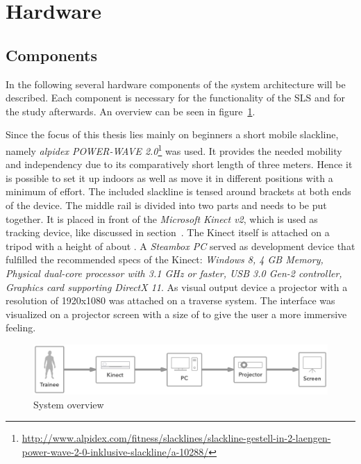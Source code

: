 \section{Hardware}\label{5_1_systemSetup}
\subsection{Components}\label{5_3_systemArchitecture}
In the following several hardware components of the system architecture will be described. Each component is necessary for the functionality of the SLS and for the study afterwards. An overview can be seen in figure~\ref{fig:5_3_systemArchitecture}.

Since the focus of this thesis lies mainly on beginners a short mobile slackline, namely \textit{alpidex POWER-WAVE 2.0}\footnote{\url{http://www.alpidex.com/fitness/slacklines/slackline-gestell-in-2-laengen-power-wave-2-0-inklusive-slackline/a-10288/}} was used.
It provides the needed mobility and independency due to its comparatively short length of three meters.
Hence it is possible to set it up indoors as well as move it in different positions with a minimum of effort.
The included slackline is tensed around brackets at both ends of the device.
The middle rail is divided into two parts and needs to be put together.
It is placed in front of the \textit{Microsoft Kinect v2}, which is used as tracking device, like discussed in section~\textit{}. The Kinect itself is attached on a  tripod with a height of about .
A \textit{Steambox PC}  served as development device that fulfilled the recommended specs of the Kinect: \textit{Windows 8, 4 GB Memory, Physical dual-core processor with 3.1 GHz or faster, USB 3.0 Gen-2 controller, Graphics card supporting DirectX 11}. As visual output device a projector  with a resolution of 1920x1080 was attached on a traverse system.
The interface was visualized on a projector screen with a size of  to give the user a more immersive feeling.

\begin{figure}[htb]
	\centering
	\begin{minipage}[t]{1\linewidth}
		\centering
		\includegraphics[width=1\linewidth]{Pictures/5_3_systemArchitecture}
		\caption{System overview}
		\label{fig:5_3_systemArchitecture}
	\end{minipage}
\end{figure}

